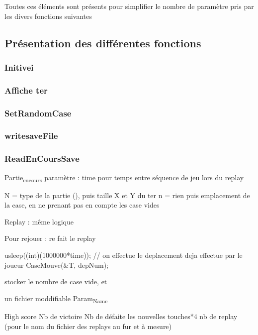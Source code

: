 \documentclass[letter]{article}
\begin{document}
Toutes ces éléments sont présents pour simplifier le nombre de paramètre pris par les divers fonctions suivantes





\subsection{Présentation des différentes fonctions}
\label{sec:org32988b4}

\subsubsection{Initivei}
\label{sec:org1cde1d5}

\subsubsection{Affiche ter}
\label{sec:org5ad3c42}

\subsubsection{SetRandomCase}
\label{sec:org9d6c966}

\subsubsection{writesaveFile}
\label{sec:orge97b042}

\subsubsection{ReadEnCoursSave}
\label{sec:org51a70e7}


Partie\textsubscript{encours}
paramètre : time pour temps entre séquence de jeu lors du replay

N = type de la partie (), puis taille X et Y du ter
n = rien
puis emplacement de la case, en ne prenant pas en compte les case vides

Replay : même logique



Pour rejouer : re fait le replay


usleep((int)(1000000*time));
// on effectue le deplacement deja effectue par le joueur
CaseMouve(\&T, depNum);

stocker le nombre de case vide, et


un fichier moddifiable
Param\textsubscript{Name}

High score
Nb de victoire
Nb de défaite
les nouvelles touches*4
nb de replay (pour le nom du fichier des replays au fur et à mesure)
\end{document}
